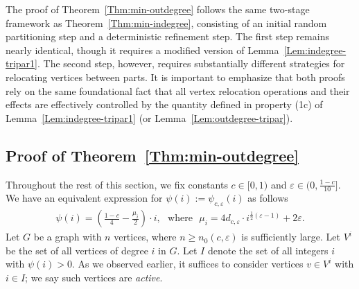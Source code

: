 \documentclass{aic}
\begin{document}
	The proof of Theorem~\ref{Thm:min-outdegree} follows the same two-stage framework as Theorem~\ref{Thm:min-indegree},
	consisting of an initial random partitioning step and a deterministic refinement step.
	The first step remains nearly identical, though it requires a modified version of Lemma~\ref{Lem:indegree-tripar1}.
	The second step, however, requires substantially different strategies for relocating vertices between parts.
	It is important to emphasize that both proofs rely on the same foundational fact that all vertex relocation operations and their effects are effectively controlled by the quantity defined in property (1c) of Lemma~\ref{Lem:indegree-tripar1} (or Lemma~\ref{Lem:outdegree-tripar}).
	
	\subsection{Proof of Theorem~\ref{Thm:min-outdegree}}\label{subsec:pf-ext-bisec}
	\noindent
	Throughout the rest of this section, we fix constants $c\in [0,1)$ and $\varepsilon\in (0,\frac{1-c}{10}]$.
	We have an equivalent expression for $\psi(i):=\psi_{c,\varepsilon}(i)$ as follows
	\begin{align}\label{equ:psi-2}
		\psi(i)=\left(\frac{1-c}{4}-\frac{\mu_i}{2}\right)\cdot i, \mbox{~~where~~} \mu_i=4d_{c,\varepsilon}\cdot i^{\frac{1}{2}(\varepsilon-1)}+2\varepsilon.
	\end{align}
	Let $G$ be a graph with $n$ vertices, where $n\geq n_0(c,\varepsilon)$ is sufficiently large.
	Let $V^i$ be the set of all vertices of degree $i$ in $G$.
	Let $I$ denote the set of all integers $i$ with $\psi(i)>0$.
	As we observed earlier, it suffices to consider vertices $v\in V^i$ with $i\in I$;
	we say such vertices are {\it active}.
	
\end{document}
